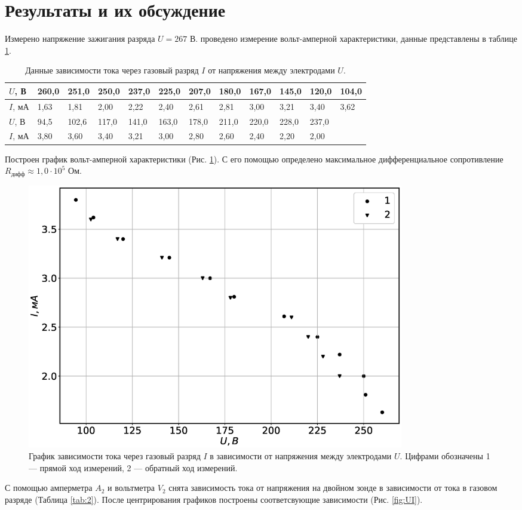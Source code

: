 \documentclass[12pt]{article}
\begin{document}
\section*{Результаты и их обсуждение}
Измерено напряжение зажигания разряда $U = 267$ В.
проведено измерение вольт-амперной характеристики, данные представлены
в таблице \ref{tab:1}.
\begin{table}[H]
	\centering
	\begin{tabular}{|l|l|l|l|l|l|l|l|l|l|l|l|}
		\hline
		$U$, В  & 260,0 & 251,0 & 250,0 & 237,0 & 225,0 & 207,0 & 180,0 & 167,0 & 145,0 & 120,0 & 104,0 \\ \hline
		$I$, мА & 1,63  & 1,81  & 2,00  & 2,22  & 2,40  & 2,61  & 2,81  & 3,00  & 3,21  & 3,40  & 3,62  \\ \hline
		$U$, В  & 94,5  & 102,6 & 117,0 & 141,0 & 163,0 & 178,0 & 211,0 & 220,0 & 228,0 & 237,0 & ~     \\ \hline
		$I$, мА & 3,80  & 3,60  & 3,40  & 3,21  & 3,00  & 2,80  & 2,60  & 2,40  & 2,20  & 2,00  & ~     \\ \hline
	\end{tabular}
	\caption{Данные зависимости тока через газовый разряд $I$ от напряжения между электродами $U$.}
	\label{tab:1}
\end{table}

Построен график вольт-амперной характеристики (Рис. \ref{fig:UpIp}). С его помощью определено максимальное дифференциальное
сопротивление $R_{\text{дифф}} \approx 1,0 \cdot 10^5$ Ом.
\begin{figure}[H]
	\centering
	\includegraphics[width=0.8\textwidth]{UpIp.eps}
	\caption{График зависимости тока через газовый разряд $I$ в зависимости от напряжения между электродами $U$.
		Цифрами обозначены 1 --- прямой ход измерений, 2 --- обратный ход измерений.}
	\label{fig:UpIp}
\end{figure}
С помощью амперметра $A_2$  и вольтметра $V_2$ снята зависимость тока от напряжения на двойном зонде в зависимости от тока в газовом 
разряде (Таблица \ref{tab:2}). 
После центрирования графиков построены соответсвующие зависимости (Рис. \ref{fig:UI}).     
\end{document}

